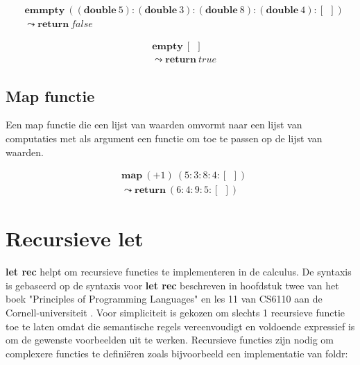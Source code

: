 \begin{equation}
    \begin{split}
        & \textbf{emmpty}\:((\textbf{double}\:5):(\textbf{double}\:3):(\textbf{double}\:8):(\textbf{double}\:4):[\:\:]) \\
        & \leadsto \textbf{return}\:false
    \end{split}
\end{equation}


\begin{equation}
    \begin{split}
        & \textbf{empty}\:[\:\:] \\
        & \leadsto \textbf{return}\:true
    \end{split}
\end{equation}

\subsection{Map functie}
Een map functie die een lijst van waarden omvormt naar een lijst van computaties met als argument een functie om toe te passen op de lijst van waarden.

\begin{equation}
    \begin{split}
        & \textbf{map}\:(+1)\:(5:3:8:4:[\:\:]) \\
        & \leadsto \textbf{return}\:(6:4:9:5:[\:\:])
    \end{split}
\end{equation}

\section{Recursieve let}
\textbf{let rec} helpt om recursieve functies te implementeren in de calculus. De syntaxis is gebaseerd op de syntaxis voor \textbf{let rec} beschreven in hoofdstuk twee van het boek "Principles of Programming Languages" \cite{Palmer2009} en les 11 van CS6110 aan de Cornell-universiteit \cite{Sampson2018}. Voor simpliciteit is gekozen om slechts 1 recursieve functie toe te laten omdat die semantische regels vereenvoudigt en voldoende expressief is om de gewenste voorbeelden uit te werken.  Recursieve functies zijn nodig om complexere functies te definiëren zoals bijvoorbeeld een implementatie van foldr:

